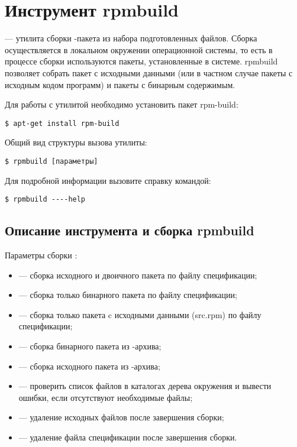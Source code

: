 \hypertarget{rpmbuild}{\chapter{Инструмент rpmbuild}}\label{chapter-rpmbuild}


 --- утилита сборки -пакета из набора подготовленных файлов. Сборка осуществляется
в локальном окружении операционной системы, то есть в процессе сборки используются пакеты,
установленные в системе. rpmbuild позволяет собрать пакет с исходными данными (или в частном
случае пакеты с исходным кодом программ) и пакеты с бинарным содержимым.

Для работы с утилитой необходимо установить пакет rpm-build:

\begin{verbatim}
$ apt-get install rpm-build
\end{verbatim}

Общий вид структуры вызова утилиты:

\begin{verbatim}
$ rpmbuild [параметры]
\end{verbatim}

Для подробной информации вызовите справку командой:

\begin{verbatim}
$ rpmbuild ----help
\end{verbatim}

\section{Описание инструмента и сборка rpmbuild}

Параметры сборки :
\begin{itemize}
    \item {} --- сборка исходного и двоичного пакета по файлу спецификации;
    \item {} --- сборка только бинарного пакета по файлу спецификации;
    \item {} --- сборка только пакета c исходными данными (src.rpm) по файлу спецификации;
    \item {} --- сборка бинарного пакета из -архива;
    \item {} --- сборка исходного пакета из -архива;
    \item {} --- проверить список файлов в каталогах дерева окружения и вывести ошибки,
    если отсутствуют необходимые файлы;
    \item {} --- удаление исходных файлов после завершения сборки;
    \item {} --- удаление файла спецификации после завершения сборки.
\end{itemize}

